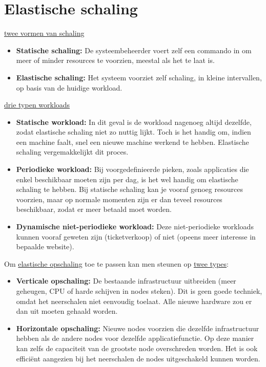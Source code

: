 	\chapter{Elastische schaling}
	\underline{twee vormen van schaling}
	\begin{itemize}
		\item  \textbf{Statische schaling:} De systeembeheerder voert zelf een commando in om meer of minder resources te voorzien, meestal als het te laat is.
		\item  \textbf{Elastische schaling:} Het systeem voorziet zelf schaling, in kleine intervallen, op basis van de huidige workload.
	\end{itemize}
	\underline{drie typen workloads}
	\begin{itemize}
		\item  \textbf{Statische workload:} In dit geval is de workload nagenoeg altijd dezelfde, zodat elastische schaling niet zo nuttig lijkt. Toch is het handig om, indien een machine faalt, snel een nieuwe machine werkend te hebben. Elastische schaling vergemakkelijkt dit proces. 
		\item  \textbf{Periodieke workload:} Bij voorgedefinieerde pieken, zoals applicaties die enkel beschikbaar moeten zijn per dag, is het wel handig om elastische schaling te hebben. Bij statische schaling kan je vooraf genoeg resources voorzien, maar op normale momenten zijn er dan teveel resources beschikbaar, zodat er meer betaald moet worden.
		\item  \textbf{Dynamische niet-periodieke workload:} Deze niet-periodieke workloads kunnen vooraf geweten zijn (ticketverkoop) of niet (opeens meer interesse in bepaalde website). 
	\end{itemize}

	Om \underline{elastische opschaling} toe te passen kan men steunen op \underline{twee types}:
	\begin{itemize}
		\item[\alert] \textbf{Verticale opschaling:} De bestaande infrastructuur uitbreiden (meer geheugen, CPU of harde schijven in nodes steken). Dit is geen goede techniek, omdat het neerschalen niet eenvoudig toelaat. Alle nieuwe hardware zou er dan uit moeten gehaald worden.
		\item[\good] \textbf{Horizontale opschaling:} Nieuwe nodes voorzien die dezelfde infrastructuur hebben als de andere nodes voor dezelfde applicatiefunctie. Op deze manier kan zelfs de capaciteit van de grootste node overschreden worden. Het is ook efficiënt aangezien bij het neerschalen de nodes uitgeschakeld kunnen worden.
	\end{itemize}

